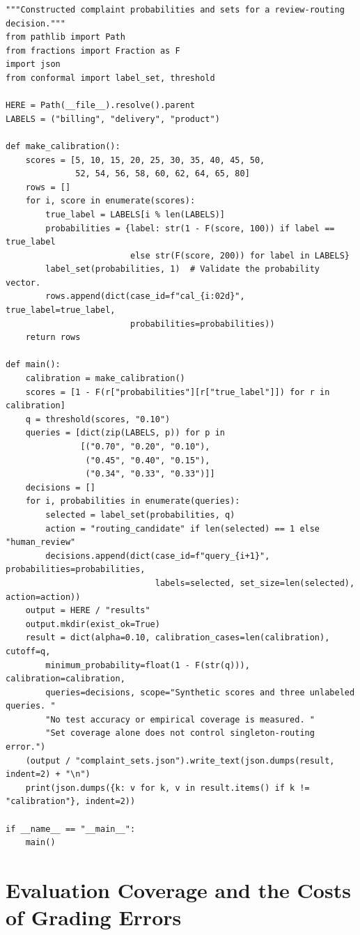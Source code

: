 \begin{Verbatim}[breaklines,breakanywhere,fontsize=\small]
"""Constructed complaint probabilities and sets for a review-routing decision."""
from pathlib import Path
from fractions import Fraction as F
import json
from conformal import label_set, threshold

HERE = Path(__file__).resolve().parent
LABELS = ("billing", "delivery", "product")

def make_calibration():
    scores = [5, 10, 15, 20, 25, 30, 35, 40, 45, 50,
              52, 54, 56, 58, 60, 62, 64, 65, 80]
    rows = []
    for i, score in enumerate(scores):
        true_label = LABELS[i % len(LABELS)]
        probabilities = {label: str(1 - F(score, 100)) if label == true_label
                         else str(F(score, 200)) for label in LABELS}
        label_set(probabilities, 1)  # Validate the probability vector.
        rows.append(dict(case_id=f"cal_{i:02d}", true_label=true_label,
                         probabilities=probabilities))
    return rows

def main():
    calibration = make_calibration()
    scores = [1 - F(r["probabilities"][r["true_label"]]) for r in calibration]
    q = threshold(scores, "0.10")
    queries = [dict(zip(LABELS, p)) for p in
               [("0.70", "0.20", "0.10"),
                ("0.45", "0.40", "0.15"),
                ("0.34", "0.33", "0.33")]]
    decisions = []
    for i, probabilities in enumerate(queries):
        selected = label_set(probabilities, q)
        action = "routing_candidate" if len(selected) == 1 else "human_review"
        decisions.append(dict(case_id=f"query_{i+1}", probabilities=probabilities,
                              labels=selected, set_size=len(selected), action=action))
    output = HERE / "results"
    output.mkdir(exist_ok=True)
    result = dict(alpha=0.10, calibration_cases=len(calibration), cutoff=q,
        minimum_probability=float(1 - F(str(q))), calibration=calibration,
        queries=decisions, scope="Synthetic scores and three unlabeled queries. "
        "No test accuracy or empirical coverage is measured. "
        "Set coverage alone does not control singleton-routing error.")
    (output / "complaint_sets.json").write_text(json.dumps(result, indent=2) + "\n")
    print(json.dumps({k: v for k, v in result.items() if k != "calibration"}, indent=2))

if __name__ == "__main__":
    main()
\end{Verbatim}

\hypertarget{M07-evaluation-coverage-and-the-costs-of-grading-errors}{%
\section{Evaluation Coverage and the Costs of Grading
Errors}\label{M07-evaluation-coverage-and-the-costs-of-grading-errors}}

